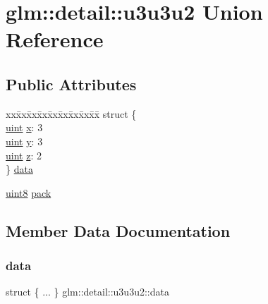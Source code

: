 \hypertarget{unionglm_1_1detail_1_1u3u3u2}{}\section{glm\+:\+:detail\+:\+:u3u3u2 Union Reference}
\label{unionglm_1_1detail_1_1u3u3u2}
\subsection*{Public Attributes}
\begin{DoxyCompactItemize}
\item 
\begin{tabbing}
xx\=xx\=xx\=xx\=xx\=xx\=xx\=xx\=xx\=\kill
struct \{\\
\>\mbox{\hyperlink{group__core__precision_ga4fd29415871152bfb5abd588334147c8}{uint}} \mbox{\hyperlink{unionglm_1_1detail_1_1u3u3u2_aaa6af1d1bd34a7e72c0d7b1bb622a4da}{x}}: 3\\
\>\mbox{\hyperlink{group__core__precision_ga4fd29415871152bfb5abd588334147c8}{uint}} \mbox{\hyperlink{unionglm_1_1detail_1_1u3u3u2_a2139299d7ae9d48a986ddd3edff8d669}{y}}: 3\\
\>\mbox{\hyperlink{group__core__precision_ga4fd29415871152bfb5abd588334147c8}{uint}} \mbox{\hyperlink{unionglm_1_1detail_1_1u3u3u2_a53e88031a04c880792dd6e36f8e96f9a}{z}}: 2\\
\} \mbox{\hyperlink{unionglm_1_1detail_1_1u3u3u2_a57d54b9b29a5b2cae7b37e6428bd888b}{data}}\\

\end{tabbing}\item 
\mbox{\hyperlink{namespaceglm_1_1detail_aef2588f97d090cc19fbbe0c74fe17c8f}{uint8}} \mbox{\hyperlink{unionglm_1_1detail_1_1u3u3u2_aea48c2c7d1d3283f3c785daa33551351}{pack}}
\end{DoxyCompactItemize}


\subsection{Member Data Documentation}
\mbox{\label{unionglm_1_1detail_1_1u3u3u2_a57d54b9b29a5b2cae7b37e6428bd888b}} 
\subsubsection{\texorpdfstring{data}{data}}
{\footnotesize\ttfamily struct \{ ... \}   glm\+::detail\+::u3u3u2\+::data}

